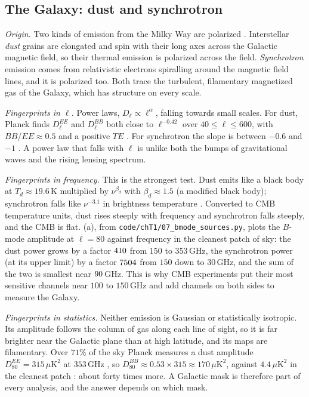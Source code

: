\subsection{The Galaxy: dust and synchrotron}
\label{T1c:sec:galaxy}

\emph{Origin.} Two kinds of emission from the Milky Way are polarized \cite{Planck2018XI,Planck2018IV}. Interstellar \emph{dust} grains are elongated and spin with their long axes across the Galactic magnetic field, so their thermal emission is polarized across the field. \emph{Synchrotron} emission comes from relativistic electrons spiralling around the magnetic field lines, and it is polarized too. Both trace the turbulent, filamentary magnetized gas of the Galaxy, which has structure on every scale.

\emph{Fingerprints in $\ell$.} Power laws, $D_\ell\propto\ell^{\alpha}$, falling towards small scales. For dust, Planck finds $D_\ell^{EE}$ and $D_\ell^{BB}$ both close to $\ell^{-0.42}$ over $40\le\ell\le600$, with $BB/EE\approx0.5$ and a positive $TE$ \cite{Planck2018XI}. For synchrotron the slope is between $-0.6$ and $-1$ \cite{BICEPKeck2021}. A power law that falls with $\ell$ is unlike both the bumps of gravitational waves and the rising lensing spectrum.

\emph{Fingerprints in frequency.} This is the strongest test. Dust emits like a black body at $T_d\approx19.6\,$K multiplied by $\nu^{\beta_d}$ with $\beta_d\approx1.5$ (a modified black body); synchrotron falls like $\nu^{-3.1}$ in brightness temperature \cite{BICEPKeck2021}. Converted to CMB temperature units, dust rises steeply with frequency and synchrotron falls steeply, and the CMB is flat. (a), from \nolinkurl{code/chT1/07_bmode_sources.py}, plots the $B$-mode amplitude at $\ell=80$ against frequency in the cleanest patch of sky: the dust power grows by a factor $410$ from $150$ to $353\,$GHz, the synchrotron power (at its upper limit) by a factor $7504$ from $150$ down to $30\,$GHz, and the sum of the two is smallest near $90\,$GHz. This is why CMB experiments put their most sensitive channels near $100$ to $150\,$GHz and add channels on both sides to measure the Galaxy.

\emph{Fingerprints in statistics.} Neither emission is Gaussian or statistically isotropic. Its amplitude follows the column of gas along each line of sight, so it is far brighter near the Galactic plane than at high latitude, and its maps are filamentary. Over $71\%$ of the sky Planck measures a dust amplitude $D_{80}^{EE}=315\,\mu\mathrm K^2$ at $353\,$GHz \cite{Planck2018XI}, so $D_{80}^{BB}\approx0.53\times315\approx170\,\mu\mathrm K^2$, against $4.4\,\mu\mathrm K^2$ in the cleanest patch \cite{BICEPKeck2021}: about forty times more. A Galactic mask is therefore part of every analysis, and the answer depends on which mask.

